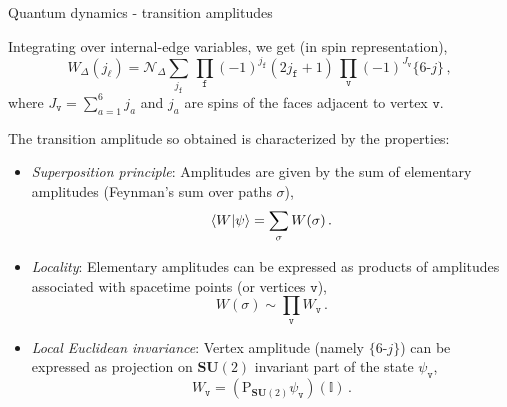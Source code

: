 \documentclass[12pt,titlepage]{article}
\begin{document}
\begin{frame}{Quantum dynamics - transition amplitudes}
    \begin{list}{\,}{\leftmargin=1em \itemindent=0em}
        \item<1-> Integrating over internal-edge variables, we get (in spin representation),
        \begin{equation}\label{ponz_reg}
            W_\Delta(j_\ell)=\mathcal{N}_\Delta\sum_{j_\mathtt{f}}\,\prod_\mathtt{f}(-1)^{j_\mathtt{f}}(2j_\mathtt{f}+1)\,\prod_\mathtt{v}(-1)^{J_\mathtt{v}}\{6\text{-}j\}\,,
        \end{equation}
        where $J_\mathtt{v}=\sum_{a=1}^{6}j_a$ and $j_a$ are spins of the faces adjacent to vertex $\mathtt{v}$.
        \item<2-> The transition amplitude so obtained is characterized by the properties:
        \begin{itemize}
            \item<2-> \textit{Superposition principle}: Amplitudes are given by the sum of elementary amplitudes (Feynman's sum over paths $\sigma$),
            \vspace{-1pt}
            \begin{equation}
                \braket{W}{\psi}=\sum_\sigma W(\sigma)\,.
            \end{equation}
            \item<3-> \vspace{-2pt}\textit{Locality}: Elementary amplitudes can be expressed as products of amplitudes associated with spacetime points (or vertices $\mathtt{v}$),
            \vspace{-1pt}
            \begin{equation}
                W(\sigma)\sim\prod_\mathtt{v}W_\mathtt{v}\,.
            \end{equation}
            \item<4-> \vspace{-2pt}\textit{Local Euclidean invariance}: Vertex amplitude (namely $\{6\text{-}j\}$) can be expressed as projection on $\mathbf{SU}(2)$ invariant part of the state $\psi_\mathtt{v}$,
            \vspace{-1pt}
            \begin{equation}
                W_\mathtt{v}=(\operatorname{P_{\mathbf{SU}(2)}}\psi_\mathtt{v})(\mathbb{I})\,.
            \end{equation}
        \end{itemize}
    \end{list}
\end{frame}
\end{document}

